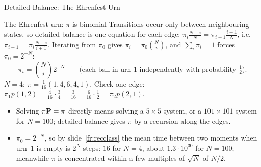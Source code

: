 \begin{frame}{Detailed Balance: The Ehrenfest Urn}
  \label{fr:ehrenfest}
  \small
  \begin{exampleblock}{The Ehrenfest urn: $\pi$ is binomial}
    Transitions occur only between neighbouring states, so detailed balance is one equation for each edge: $\pi_i\frac{N-i}{N}=\pi_{i+1}\frac{i+1}{N}$, i.e.\ $\pi_{i+1}=\pi_i\frac{N-i}{i+1}$. Iterating from $\pi_0$ gives $\pi_i=\pi_0\binom Ni$, and $\sum_i\pi_i=1$ forces $\pi_0=2^{-N}$:
    \[
      \pi_i=\binom Ni2^{-N}\qquad\text{(each ball in urn 1 independently with probability } \tfrac12\text{)}.
    \]
    $N=4$: $\pi=\tfrac1{16}(1,4,6,4,1)$. Check one edge: $\pi_1p(1,2)=\tfrac4{16}\cdot\tfrac34=\tfrac3{16}=\tfrac6{16}\cdot\tfrac12=\pi_2p(2,1)$.
  \end{exampleblock}
  \begin{itemize}
    \item Solving $\pi\mathbf{P}=\pi$ directly means solving a $5\times5$ system, or a $101\times101$ system for $N=100$; detailed balance gives $\pi$ by a recursion along the edges.
    \item $\pi_0=2^{-N}$, so by slide~\ref{fr:recclass} the mean time between two moments when urn~$1$ is empty is $2^N$ steps: $16$ for $N=4$, about $1.3\cdot10^{30}$ for $N=100$; meanwhile $\pi$ is concentrated within a few multiples of $\sqrt N$ of $N/2$.
  \end{itemize}
\end{frame}

